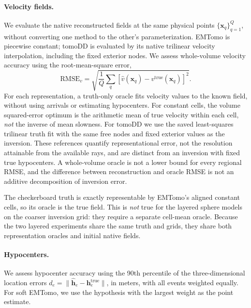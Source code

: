 \paragraph{Velocity fields.}
We evaluate the native reconstructed fields at the same physical points $\{\mathbf{x}_q\}_{q=1}^Q$, without converting one method to the other's parameterization. EMTomo is piecewise constant; tomoDD is evaluated by its native trilinear velocity interpolation, including the fixed exterior nodes. We assess whole-volume velocity accuracy using the root-mean-square error,
\begin{equation}
\mathrm{RMSE}_v=\sqrt{\frac{1}{Q}\sum_q[\widehat v(\mathbf{x}_q)-v^{\mathrm{true}}(\mathbf{x}_q)]^2}.
\label{eq:velocity_metrics}
\end{equation}
For each representation, a truth-only oracle fits velocity values to the known field, without using arrivals or estimating hypocenters. For constant cells, the volume squared-error optimum is the arithmetic mean of true velocity within each cell, \emph{not} the inverse of mean slowness. For tomoDD we use the saved least-squares trilinear truth fit with the same free nodes and fixed exterior values as the inversion. These references quantify representational error, not the resolution attainable from the available rays, and are distinct from an inversion with fixed true hypocenters. A whole-volume oracle is not a lower bound for every regional RMSE, and the difference between reconstruction and oracle RMSE is not an additive decomposition of inversion error.

The checkerboard truth is exactly representable by EMTomo's aligned constant cells, so its oracle is the true field. This is \emph{not} true for the layered sphere models on the coarser inversion grid: they require a separate cell-mean oracle. Because the two layered experiments share the same truth and grids, they share both representation oracles and initial native fields.

\paragraph{Hypocenters.}
We assess hypocenter accuracy using the 90th percentile of the three-dimensional location errors $d_e=\|\widehat{\mathbf{h}}_e-\mathbf{h}^{\mathrm{true}}_e\|$, in meters, with all events weighted equally. For soft EMTomo, we use the hypothesis with the largest weight as the point estimate.

